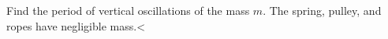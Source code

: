 Find the period of vertical oscillations of the mass $m$. The spring, pulley,
        and ropes have negligible mass.<%
